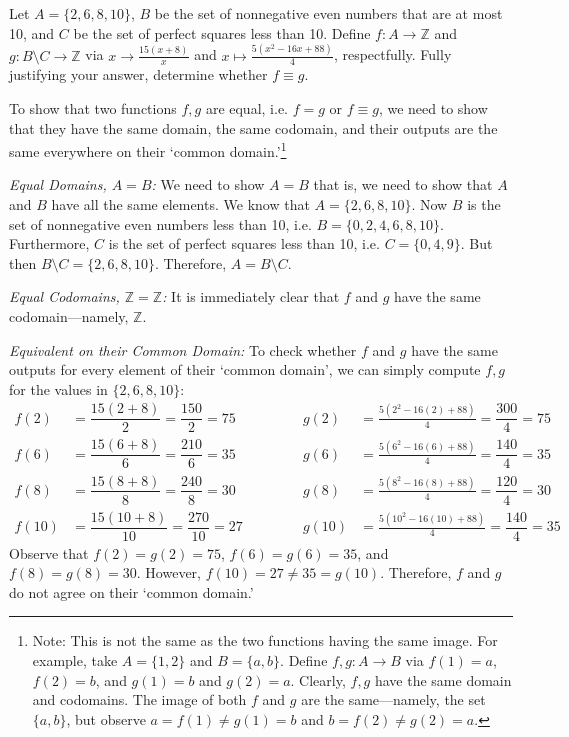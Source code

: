 \documentclass[11pt,letterpaper]{article}
\begin{document}

 Let $A= \{ 2, 6, 8, 10 \}$, $B$ be the set of nonnegative even numbers that are at most 10, and $C$ be the set of perfect squares less than 10. Define $f: A \to \mathbb{Z}$ and $g: B \setminus C \to \mathbb{Z}$ via $x \to \frac{15(x + 8)}{x}$ and $x \mapsto \frac{5(x^2 - 16x + 88)}{4}$, respectfully. Fully justifying your answer, determine whether $f \equiv g$. \pspace

\sol To show that two functions $f, g$ are equal, i.e. $f = g$ or $f \equiv g$, we need to show that they have the same domain, the same codomain, and their outputs are the same everywhere on their `common domain.'\footnote{Note: This is not the same as the two functions having the same image. For example, take $A= \{ 1, 2 \}$ and $B= \{ a, b \}$. Define $f, g: A \to B$ via $f(1)= a$, $f(2)= b$, and $g(1)= b$ and $g(2)= a$. Clearly, $f, g$ have the same domain and codomains. The image of both $f$ and $g$ are the same---namely, the set $\{ a, b \}$, but observe $a= f(1) \neq g(1)= b$ and $b= f(2) \neq g(2)= a$.} \pspace

{\itshape Equal Domains, $A= B$:} We need to show $A= B$ that is, we need to show that $A$ and $B$ have all the same elements. We know that $A= \{ 2, 6, 8, 10 \}$. Now $B$ is the set of nonnegative even numbers less than 10, i.e. $B= \{ 0, 2, 4, 6, 8, 10 \}$. Furthermore, $C$ is the set of perfect squares less than 10, i.e. $C= \{ 0, 4, 9 \}$. But then $B \setminus C= \{ 2, 6, 8, 10 \}$. Therefore, $A= B \setminus C$. \pspace

{\itshape Equal Codomains, $\mathbb{Z}= \mathbb{Z}$:} It is immediately clear that $f$ and $g$ have the same codomain---namely, $\mathbb{Z}$. \pspace

{\itshape Equivalent on their Common Domain:} To check whether $f$ and $g$ have the same outputs for every element of their `common domain', we can simply compute $f, g$ for the values in $\{ 2, 6, 8, 10 \}$:
	\[
	\begin{aligned}
	f(2)&= \dfrac{15(2 + 8)}{2}= \dfrac{150}{2}= 75 \qquad\qquad& g(2)&= \frac{5(2^2 - 16(2) + 88)}{4}= \dfrac{300}{4}= 75 \\
	f(6)&= \dfrac{15(6 + 8)}{6}= \dfrac{210}{6}= 35 & g(6)&= \frac{5(6^2 - 16(6) + 88)}{4}= \dfrac{140}{4}= 35 \\
	f(8)&= \dfrac{15(8+ 8)}{8}= \dfrac{240}{8}= 30 & g(8)&= \frac{5(8^2 - 16(8) + 88)}{4}= \dfrac{120}{4}= 30 \\
	f(10)&= \dfrac{15(10 + 8)}{10}= \dfrac{270}{10}= 27 & g(10)&= \frac{5(10^2 - 16(10) + 88)}{4}= \dfrac{140}{4}= 35
	\end{aligned}
	\]
Observe that $f(2)= g(2)= 75$, $f(6)= g(6)= 35$, and $f(8)= g(8)= 30$. However, $f(10)= 27 \neq 35= g(10)$. Therefore, $f$ and $g$ do not agree on their `common domain.' \pspace
\end{document}
